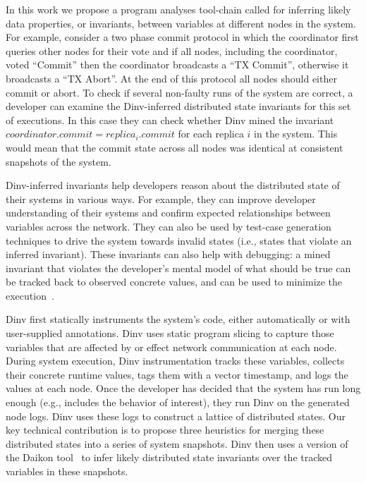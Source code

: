 In this work we propose a program analyses tool-chain called
\emph{\dinv} for inferring likely data properties, or
invariants, between variables at different nodes in the system.
%
For example, consider a two phase commit protocol in which the
coordinator first queries other nodes for their vote and if all nodes,
including the coordinator, voted ``Commit'' then the coordinator
broadcasts a ``TX Commit'', otherwise it broadcasts a ``TX Abort''. At
the end of this protocol all nodes should either commit or abort. To
check if several non-faulty runs of the system are correct, a
developer can examine the Dinv-inferred distributed state invariants
for this set of executions. In this case they can check whether Dinv
mined the invariant $coordinator.commit = replica_i.commit$ for each
replica $i$ in the system. This would mean that the commit state
across all nodes was identical at consistent snapshots of the system.

Dinv-inferred invariants help developers reason about the distributed
state of their systems in various ways. For
example, they can improve developer understanding of their systems and
confirm expected relationships between variables across the network.
They can also be used by test-case generation techniques to drive the
system towards invalid states (i.e., states that violate an inferred
invariant). These invariants can also help with debugging: a mined
invariant that violates the developer's mental model of what should be
true can be tracked back to observed concrete values, and can be used
to minimize the execution~\cite{scottminimizing}.

Dinv first statically instruments the system's code, either
automatically or with user-supplied annotations. Dinv uses static
program slicing to capture those variables that are affected by or
effect network communication at each node. During system execution,
Dinv instrumentation tracks these variables, collects their concrete
runtime values, tags them with a vector timestamp, and logs the values
at each node. Once the developer has decided that the system has run
long enough (e.g., includes the behavior of interest), they run Dinv
on the generated node logs. Dinv uses these logs to construct a
lattice of distributed states. Our key technical contribution is to
propose three heuristics for merging these distributed states into a
series of system snapshots. Dinv then uses a version of the Daikon
tool~\cite{Ernst07} to infer likely distributed state invariants over
the tracked variables in these snapshots.

